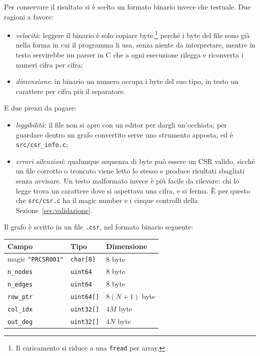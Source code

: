 \documentclass[11pt,a4paper]{article}
\newcommand{\stacco}{\par\medskip\noindent}
\begin{document}
\stacco
Per conservare il risultato si è scelto un formato binario invece che
testuale. Due ragioni a favore:
\begin{itemize}\itemsep2pt
  \item \emph{velocità}: leggere il binario è solo copiare
    byte,\footnote{Il caricamento si riduce a una \texttt{fread} per array.}
    perché i byte del file sono già nella forma in cui il programma li usa,
    senza niente da interpretare, mentre in testo servirebbe un parser in C
    che a ogni esecuzione rilegga e riconverta i numeri cifra per cifra;
  \item \emph{dimensione}: in binario un numero occupa i byte del suo tipo,
    in testo un carattere per cifra più il separatore.
\end{itemize}
E due prezzi da pagare:
\begin{itemize}\itemsep2pt
  \item \emph{leggibilità}: il file non si apre con un editor per dargli
    un'occhiata; per guardare dentro un grafo convertito serve uno strumento
    apposta, ed è \texttt{src/csr\_info.c};
  \item \emph{errori silenziosi}: qualunque sequenza di byte può essere un
    CSR valido, sicché un file corrotto o troncato viene letto lo stesso e
    produce risultati sbagliati senza avvisare.
    Un testo malformato invece è più facile da rilevare:
    chi lo legge trova un carattere dove si aspettava una cifra, e si ferma.
    È per questo che \texttt{src/csr.c} ha il magic number e i cinque controlli
    della Sezione~\ref{sec:validazione}.
\end{itemize}

Il grafo è scritto in un file \texttt{.csr}, nel formato binario seguente:
\begin{center}
\begin{tabular}{@{}lll@{}}
\toprule
\textbf{Campo} & \textbf{Tipo} & \textbf{Dimensione} \\
\midrule
magic \texttt{"PRCSR001"} & \texttt{char[8]}   & 8 byte \\
\texttt{n\_nodes}         & \texttt{uint64}    & 8 byte \\
\texttt{n\_edges}         & \texttt{uint64}    & 8 byte \\
\texttt{row\_ptr}         & \texttt{uint64[]}  & $8(N{+}1)$ byte \\
\texttt{col\_idx}         & \texttt{uint32[]}  & $4M$ byte \\
\texttt{out\_deg}         & \texttt{uint32[]}  & $4N$ byte \\
\bottomrule
\end{tabular}
\end{center}
\end{document}
